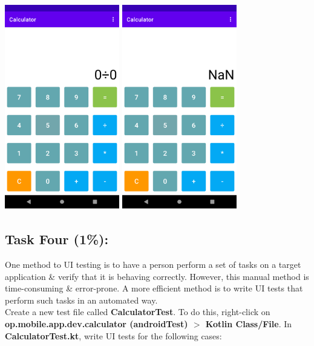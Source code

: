 \documentclass{article}
\begin{document}
\includegraphics[width=5cm, height=9cm]{../../resources/img/practicals/02-calculator-5.png}
\includegraphics[width=5cm, height=9cm]{../../resources/img/practicals/02-calculator-6.png}

\subsection*{Task Four (1\%):} 
One method to UI testing is to have a person perform a set of tasks on a target application \& verify that it is behaving correctly. However, this manual method is time-consuming \& error-prone. A more efficient method is to write UI tests that perform such tasks in an automated way. \\

Create a new test file called \textbf{CalculatorTest}. To do this, right-click on \textbf{op.mobile.app.dev.calculator (androidTest) $>$ Kotlin Class/File}. In \textbf{CalculatorTest.kt}, write UI tests for the following cases:
\end{document}

